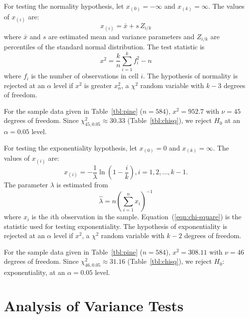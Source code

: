 \documentclass[draft]{article}
\newenvironment{example}{%
   \vspace{\baselineskip}
   \par\noindent\hrulefill\par
   \noindent{\em Example:}}{%
   \par\noindent\hrulefill\par
   \vspace{\baselineskip}}
\begin{document}
For testing the normality hypothesis,
let \(x_{\left(0\right)}=-\infty\) and
\(x_{\left(k\right)}=\infty\).
The values of \(x_{\left(i\right)}\) are:
\begin{equation}
x_{\left(i\right)} = \bar{x} + s\,Z_{i/k} 
\end{equation}
where \(\bar{x}\) and \(s\) are estimated
mean and variance parameters and \(Z_{i/k}\)
are percentiles of the standard normal distribution.
The test statistic is
\begin{equation}
\label{eqn:chi-square}
x^2 = \frac{k}{n}\sum_{i=1}^k f_i^2-n
\end{equation}
where \(f_i\) is the number of observations in cell \(i\).
The hypothesis of normality is rejected at an \(\alpha\)
level if \(x^2\) is greater \(x^2_{\alpha}\), a 
\(\chi^2\) random variable with \(k-3\) degrees of freedom.

\begin{example}
For the sample data given in Table~\ref{tbl:pine} (\(n=584\)), 
\(x^2 = 952.7\) with \(\nu=45\) degrees of freedom. 
Since \(\chi^2_{45,0.05}\approx30.33\) (Table~\ref{tbl:chisq}),
we reject \(H_0\) at an \(\alpha=0.05\) level.
\end{example}

For testing the exponentiality hypothesis,
let \(x_{\left(0\right)}=0\) and
\(x_{\left(k\right)}=\infty\).
The values of \(x_{\left(i\right)}\) are:
\begin{equation}
x_{\left(i\right)} = -\frac{1}{\lambda}\ln\left(1-\frac{i}{k}\right),
i=1,2,\ldots,k-1.
\end{equation}
The parameter \(\lambda\) is estimated from
\begin{equation}
\hat{\lambda} = n \left(\sum_{i=1}^n x_i\right)^{-1}
\end{equation}
where \(x_i\) is the \(i\)th observation in 
the sample.  Equation~(\ref{eqn:chi-square})
is the statistic used for testing exponentiality. The hypothesis
of exponentiality is rejected at an \(\alpha\) level if
\(x^2\), a \(\chi^2\) random variable with \(k-2\)
degrees of freedom.

\begin{example}
For the sample data given in Table~\ref{tbl:pine} (\(n=584\)), 
\(x^2 = 308.11\) with \(\nu=46\) degrees of freedom. 
Since \(\chi^2_{46,0.05}\approx31.16\) (Table~\ref{tbl:chisq}),
we reject \(H_0:\) exponentiality, at an \(\alpha=0.05\) level.
\end{example}

\section{Analysis of Variance Tests}
\end{document}
